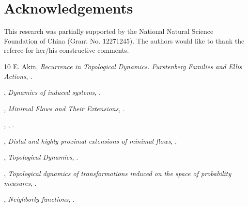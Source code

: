 \documentclass[12pt,final,3p,times]{elsarticle}
\theoremstyle{definition}
\numberwithin{equation}{section}
\begin{document}
\section*{Acknowledgements}
\noindent This research was partially supported by the National Natural Science Foundation of China (Grant No. 12271245). The authors would like to thank the referee for her/his constructive comments.

\begin{thebibliography}{10}
%
\newblock E. Akin,
\newblock \emph{Recurrence in Topological Dynamics. Furstenberg Families and Ellis Actions},
.

,
\newblock \emph{Dynamics of induced systems},
.

  ,
  \newblock \emph{Minimal Flows and Their Extensions},
  .

   ,
   ,
   .

   ,
   \newblock \emph{Distal and highly proximal extensions of minimal flows},
   .

,
\newblock \emph{Topological Dynamics},
.


,
\newblock \emph{Topological dynamics of transformations induced on the space of probability measures},
.

,
\newblock \emph{Neighborly functions},
.


\end{thebibliography}
\end{document}
